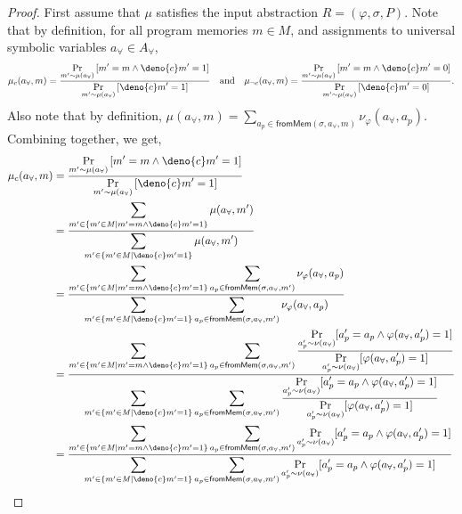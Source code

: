 \documentclass[acmsmall,review,anonymous]{acmart}\settopmatter{printfolios=true,printccs=false,printacmref=false}
\begin{document}
\begin{proof}
  First assume that $\mu$ satisfies the input abstraction $R=(\varphi,\sigma,P)$. Note that by definition, for all program memories $m \in \mathit{M}$, and assignments to universal symbolic variables $a_{\forall} \in \mathit{A}_{\forall}$,
  \[
    \mu_c(a_{\forall},m) = \frac{\displaystyle\Pr_{m' \sim \mu(a_{\forall})}\left[ m' = m \land \deno{c}m' = 1 \right]}{\displaystyle\Pr_{m' \sim \mu(a_{\forall})}\left[ \deno{c}m' = 1 \right]}\quad\text{and}\quad \mu_{\neg c}(a_{\forall},m) = \frac{\displaystyle\Pr_{m' \sim \mu(a_{\forall})}\left[ m' = m \land \deno{c}m' = 0 \right]}{\displaystyle\Pr_{m' \sim \mu(a_{\forall})}\left[ \deno{c}m' = 0 \right]}.
  \]
  Also note that by definition, $\mu(a_{\forall},m) = \sum_{a_p \in \mathsf{fromMem}(\sigma,a_{\forall},m)} \nu_{\varphi}(a_{\forall},a_p)$. Combining together, we get,
  \begin{align*}
    \mu_c(a_{\forall},m) &= \frac{\displaystyle\Pr_{m' \sim \mu(a_{\forall})}\left[ m' = m \land \deno{c}m' = 1 \right]}{\displaystyle\Pr_{m' \sim \mu(a_{\forall})}\left[ \deno{c}m' = 1 \right]} \\
                 &= \frac{\displaystyle\sum_{m' \in \{m' \in \mathit{M} \mid m' = m \wedge \deno{c}m' = 1\}}\mu(a_{\forall},m')}{\displaystyle\sum_{m' \in \{m' \in \mathit{M} \mid \deno{c}m' = 1\}}\mu(a_{\forall},m')}\\
                 &= \frac{\displaystyle\sum_{m' \in \{m' \in \mathit{M} \mid m' = m \wedge \deno{c}m' = 1\}}\sum_{a_p \in \mathsf{fromMem}(\sigma,a_{\forall},m')} \nu_{\varphi}(a_{\forall},a_p)}{\displaystyle\sum_{m' \in \{m' \in \mathit{M} \mid \deno{c}m' = 1\}}\sum_{a_p \in \mathsf{fromMem}(\sigma,a_{\forall},m')} \nu_{\varphi}(a_{\forall},a_p)}\\
                 &= \frac{\displaystyle\sum_{m' \in \{m' \in \mathit{M} \mid m' = m \wedge \deno{c}m' = 1\}}\sum_{a_p \in \mathsf{fromMem}(\sigma,a_{\forall},m')} \frac{\displaystyle\Pr_{a_p' \sim \nu(a_{\forall})}[a_p' = a_p \wedge \varphi(a_{\forall},a_p')=1]}{\displaystyle\Pr_{a_p' \sim \nu(a_{\forall})}[\varphi(a_{\forall},a_p')=1]}}{\displaystyle\sum_{m' \in \{m' \in \mathit{M} \mid \deno{c}m' = 1\}}\sum_{a_p \in \mathsf{fromMem}(\sigma,a_{\forall},m')} \frac{\displaystyle\Pr_{a_p' \sim \nu(a_{\forall})}[a_p' = a_p \wedge \varphi(a_{\forall},a_p')=1]}{\displaystyle\Pr_{a_p' \sim \nu(a_{\forall})}[\varphi(a_{\forall},a_p')=1]}}\\
                 &= \frac{\displaystyle\sum_{m' \in \{m' \in \mathit{M} \mid m' = m \wedge \deno{c}m' = 1\}}\sum_{a_p \in \mathsf{fromMem}(\sigma,a_{\forall},m')} \Pr_{a_p' \sim \nu(a_{\forall})}[a_p' = a_p \wedge \varphi(a_{\forall},a_p')=1]}{\displaystyle\sum_{m' \in \{m' \in \mathit{M} \mid \deno{c}m' = 1\}}\sum_{a_p \in \mathsf{fromMem}(\sigma,a_{\forall},m')} \Pr_{a_p' \sim \nu(a_{\forall})}[a_p' = a_p \wedge \varphi(a_{\forall},a_p')=1]}

\end{align*}
\end{proof}
\end{document}
